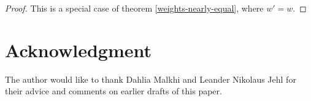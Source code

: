 \documentclass[journal]{IEEEtran}
\begin{document}
\begin{proof} This is a special case of theorem \ref{weights-nearly-equal},
where $w' = w$.  \end{proof}

\section*{Acknowledgment}

The author would like to thank Dahlia Malkhi and Leander Nikolaus Jehl for
their advice and comments on earlier drafts of this paper.



\ifCLASSOPTIONcaptionsoff
  \newpage
\fi







%

% 
\end{document}
